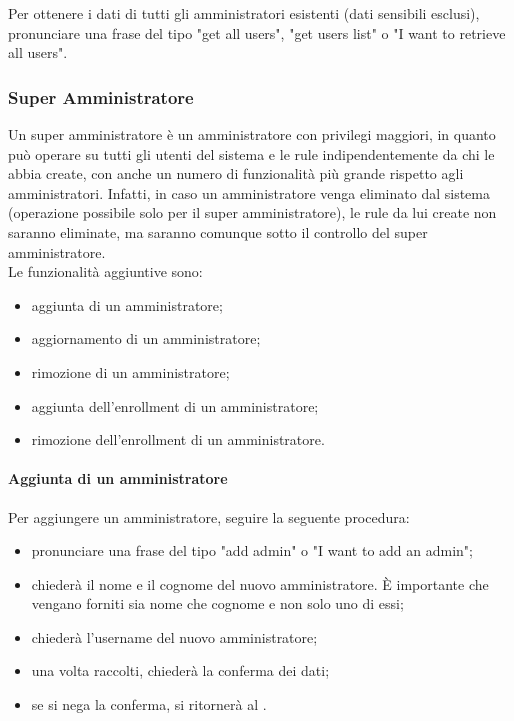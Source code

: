 Per ottenere i dati di tutti gli amministratori esistenti (dati sensibili esclusi), pronunciare una frase del tipo "get all users", "get users list" o "I want to retrieve all users".

\subsubsection{Super Amministratore}\label{superAdmin}
Un super amministratore è un amministratore con privilegi maggiori, in quanto può operare su tutti gli utenti del sistema e le rule indipendentemente da chi le abbia create, con anche un numero di funzionalità più grande rispetto agli amministratori.
Infatti, in caso un amministratore venga eliminato dal sistema (operazione possibile solo per il super amministratore), le rule da lui create non saranno eliminate, ma saranno comunque sotto il controllo del super amministratore. \\
Le funzionalità aggiuntive sono:
\begin{itemize}
	\item aggiunta di un amministratore;
	\item aggiornamento di un amministratore;
	\item rimozione di un amministratore;
	\item aggiunta dell'enrollment di un amministratore;
	\item rimozione dell'enrollment di un amministratore.
\end{itemize}
\paragraph{Aggiunta di un amministratore}\label{AddAdmin}
Per aggiungere un amministratore, seguire la seguente procedura:
\begin{itemize}
	\item pronunciare una frase del tipo "add admin" o "I want to add an admin";
	\item \PROGETTO{} chiederà il nome e il cognome del nuovo amministratore. È importante che vengano forniti sia nome che cognome e non solo uno di essi;
	\item \PROGETTO{} chiederà l'username del nuovo amministratore;
	\item una volta raccolti, \PROGETTO{} chiederà la conferma dei dati;
	\item se si nega la conferma, si ritornerà al .
\end{itemize}

